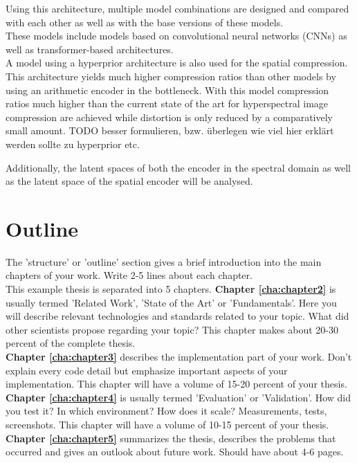 Using this architecture, multiple model combinations are designed and compared with each other as well as with the base versions of these models.\\
These models include models based on convolutional neural networks (CNNs) as well as transformer-based architectures.\\
A model using a hyperprior architecture is also used for the spatial compression. This architecture yields much higher compression ratios than other models by using an arithmetic encoder in the bottleneck. With this model compression ratios much higher than the current state of the art for hyperspectral image compression are achieved while distortion is only reduced by a comparatively small amount. TODO besser formulieren, bzw. überlegen wie viel hier erklärt werden sollte zu hyperprior etc.

Additionally, the latent spaces of both the encoder in the spectral domain as well as the latent space of the spatial encoder will be analysed.

\section{Outline\label{sec:outline}}

The 'structure' or 'outline' section gives a brief introduction into the main chapters of your work. Write 2-5 lines about each chapter.\\
This example thesis is separated into 5 chapters.
\textbf{Chapter \ref{cha:chapter2}} is usually termed 'Related Work', 'State of the Art' or 'Fundamentals'. Here you will describe relevant technologies and standards related to your topic. What did other scientists propose regarding your topic? This chapter makes about 20-30 percent of the complete thesis.
\\
\textbf{Chapter \ref{cha:chapter3}} describes the implementation part of your work. Don't explain every code detail but emphasize important aspects of your implementation. This chapter will have a volume of 15-20 percent of your thesis.
\\
\textbf{Chapter \ref{cha:chapter4}} is usually termed 'Evaluation' or 'Validation'. How did you test it? In which environment? How does it scale? Measurements, tests, screenshots. This chapter will have a volume of 10-15 percent of your thesis.
\\
\textbf{Chapter \ref{cha:chapter5}} summarizes the thesis, describes the problems that occurred and gives an outlook about future work. Should have about 4-6 pages.